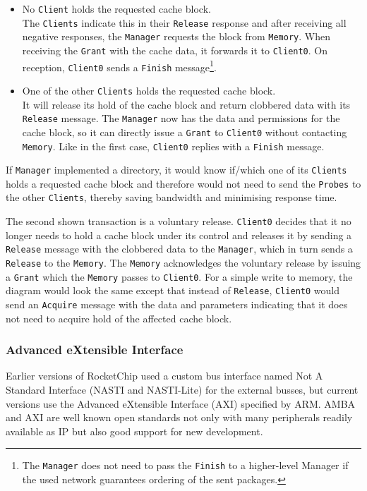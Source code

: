 \documentclass[journal,a4paper]{IEEEtran}
\makeatletter
\newcommand\footnoteref[1]{\protected@xdef\@thefnmark{\ref{#1}}\@footnotemark}
\makeatother
\begin{document}
\begin{itemize}
	\item No \texttt{Client} holds the requested cache block.\\
		The \texttt{Clients} indicate this in their \texttt{Release} response and after receiving all negative responses, the \texttt{Manager} requests the block from \texttt{Memory}.
		When receiving the \texttt{Grant} with the cache data, it forwards it to \texttt{Client0}. On reception, \texttt{Client0} sends a \texttt{Finish} message\footnote{\label{no-finish-propagation}The \texttt{Manager} does not need to pass the \texttt{Finish} to a higher-level Manager if the used network guarantees ordering of the sent packages.}.
	\item One of the other \texttt{Clients} holds the requested cache block.\\
		It will release its hold of the cache block and return clobbered data with its \texttt{Release} message.
		The \texttt{Manager} now has the data and permissions for the cache block, so it can directly issue a \texttt{Grant} to \texttt{Client0} without contacting \texttt{Memory}. Like in the first case, \texttt{Client0} replies with a \texttt{Finish} message.\footnoteref{no-finish-propagation}
\end{itemize}
If \texttt{Manager} implemented a directory, it would know if/which one of its \texttt{Clients} holds a requested cache block and therefore would not need to send the \texttt{Probes} to the other \texttt{Clients}, thereby saving bandwidth and minimising response time.

The second shown transaction is a voluntary release. \texttt{Client0} decides that it no longer needs to hold a cache block under its control and releases it by sending a \texttt{Release} message with the clobbered data to the \texttt{Manager}, which in turn sends a \texttt{Release} to the \texttt{Memory}.
The \texttt{Memory} acknowledges the voluntary release by issuing a \texttt{Grant} which the \texttt{Memory} passes to \texttt{Client0}.
For a simple write to memory, the diagram would look the same except that instead of \texttt{Release}, \texttt{Client0} would send an \texttt{Acquire} message with the data and parameters indicating that it does not need to acquire hold of the affected cache block.

\subsubsection{Advanced eXtensible Interface}
\enlargethispage*{1\baselineskip}
Earlier versions of RocketChip used a custom bus interface named Not A Standard Interface (NASTI and NASTI-Lite) for the external busses, but current versions use the Advanced eXtensible Interface (AXI) specified by ARM\cite{axi}.
AMBA and AXI are well known open standards not only with many peripherals readily available as IP\cite{axi-ip} but also good support for new development\cite{axi-tools}.
\end{document}
